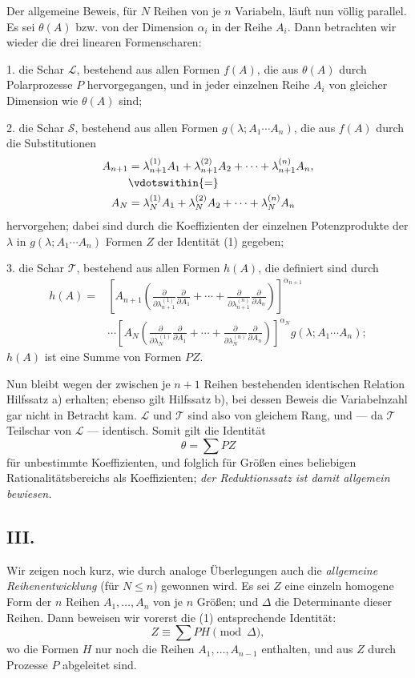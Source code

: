 Der allgemeine Beweis, für $N$ Reihen von je $n$ Variabeln, läuft nun völlig parallel. Es sei $\theta(A)$ bzw. von der Dimension $\alpha_i$ in der Reihe $A_i$. Dann betrachten wir wieder die drei linearen Formenscharen:

1. die Schar $\mathcal L$, bestehend aus allen Formen $f(A)$, die aus $\theta(A)$ durch Polarprozesse $P$ hervorgegangen, und in jeder einzelnen Reihe $A_i$ von gleicher Dimension wie $\theta(A)$ sind;

2. die Schar $\mathcal S$, bestehend aus allen Formen $g(\lambda;A_1\cdots A_n)$, die aus $f(A)$ durch die Substitutionen
\[
\begin{aligned}
 A_{n+1}&=\lambda_{n+1}^{(1)}A_1+\lambda_{n+1}^{(2)}A_2+
        \cdots+\lambda_{n+1}^{(n)}A_n,\\
 &\vdotswithin{=}\\
 A_N&=\lambda_N^{(1)}A_1+\lambda_N^{(2)}A_2+
        \cdots+\lambda_N^{(n)}A_n
\end{aligned}
\]
hervorgehen; dabei sind durch die Koeffizienten der einzelnen Potenzprodukte der $\lambda$ in $g(\lambda;A_1\cdots A_n)$ Formen $Z$ der Identität (1) gegeben;

3. die Schar $\mathcal T$, bestehend aus allen Formen $h(A)$, die definiert sind durch
\[
\begin{aligned}
 h(A)=&\left[A_{n+1}\left(
 \frac{\partial}{\partial\lambda_{n+1}^{(1)}}\frac{\partial}{\partial A_1}
 +\cdots+
 \frac{\partial}{\partial\lambda_{n+1}^{(n)}}\frac{\partial}{\partial A_n}\right)\right]^{\alpha_{n+1}} \\
&\cdots
\left[A_N\left(
 \frac{\partial}{\partial\lambda_N^{(1)}}\frac{\partial}{\partial A_1}
 +\cdots+
 \frac{\partial}{\partial\lambda_N^{(n)}}\frac{\partial}{\partial A_n}\right)\right]^{\alpha_N}
 g(\lambda;A_1\cdots A_n);
\end{aligned}
\]
$h(A)$ ist eine Summe von Formen $PZ$.

Nun bleibt wegen der zwischen je $n+1$ Reihen bestehenden identischen Relation Hilfssatz a) erhalten; ebenso gilt Hilfssatz b), bei dessen Beweis die Variabelnzahl gar nicht in Betracht kam. $\mathcal L$ und $\mathcal T$ sind also von gleichem Rang, und --- da $\mathcal T$ Teilschar von $\mathcal L$ --- identisch. Somit gilt die Identität
\[
  \theta=\sum PZ
\]
für unbestimmte Koeffizienten, und folglich für Größen eines beliebigen Rationalitätsbereichs als Koeffizienten; \emph{der Reduktionssatz ist damit allgemein bewiesen.}

\subsection*{III.}
Wir zeigen noch kurz, wie durch analoge Überlegungen auch die \emph{allgemeine Reihenentwicklung} (für $N\le n$) gewonnen wird. Es sei $Z$ eine einzeln homogene Form der $n$ Reihen $A_1,
\ldots,A_n$ von je $n$ Größen; und $\Delta$ die Determinante dieser Reihen. Dann beweisen wir vorerst die (1) entsprechende Identität:
\begin{equation}
  Z\equiv\sum PH \pmod{\Delta},
\tag{2}
\end{equation}
wo die Formen $H$ nur noch die Reihen $A_1,\ldots,A_{n-1}$ enthalten, und aus $Z$ durch Prozesse $P$ abgeleitet sind.

